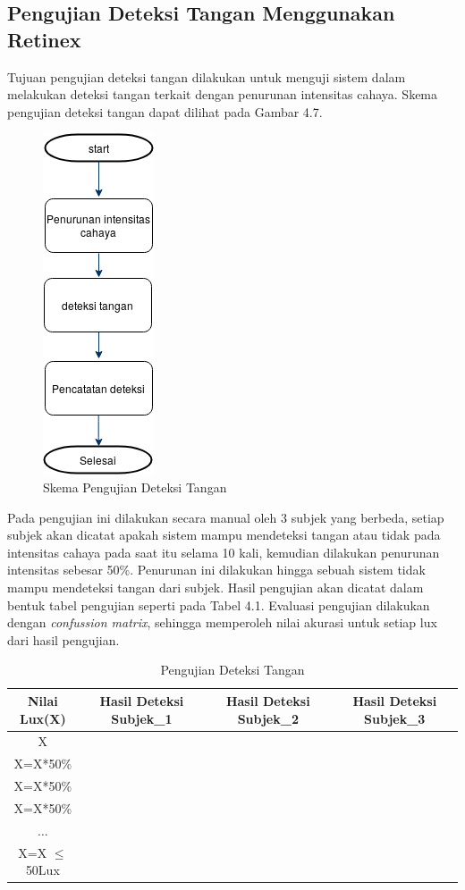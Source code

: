 \subsection{Pengujian Deteksi Tangan Menggunakan Retinex}
Tujuan pengujian deteksi tangan dilakukan untuk menguji sistem dalam melakukan deteksi tangan terkait dengan penurunan intensitas cahaya. Skema pengujian deteksi tangan dapat dilihat pada Gambar 4.7.
\begin{figure}[H]
	\centering
	\includegraphics[width=0.19\linewidth]{"skema objek deteksi"}
	\caption{Skema Pengujian Deteksi Tangan}
	\label{fig:skema-objek-deteksi}
\end{figure}
Pada pengujian ini dilakukan secara manual oleh 3 subjek yang berbeda, setiap subjek akan dicatat apakah sistem mampu mendeteksi tangan atau tidak pada intensitas cahaya pada saat itu selama 10 kali, kemudian dilakukan penurunan intensitas sebesar 50\%. Penurunan ini dilakukan hingga sebuah sistem tidak mampu mendeteksi tangan dari subjek. Hasil pengujian akan dicatat dalam bentuk tabel pengujian seperti pada Tabel 4.1. Evaluasi pengujian dilakukan dengan \emph{confussion matrix}, sehingga memperoleh nilai akurasi untuk setiap lux dari hasil pengujian.
\begin{table}[H]
	\caption{Pengujian Deteksi Tangan}
	\vspace{0.2cm}
	\centering
	\begin{tabular}{|c|c|c|c|c|c|c|c|c|c|c|c|c|c|c|c|c|c|c|c|c|c|c|c|c|c|c|c|c|c|c|}
		\hline
		Nilai Lux(X) & \multicolumn{10}{|c|}{Hasil Deteksi Subjek\_1} & \multicolumn{10}{|c|}{Hasil Deteksi Subjek\_2}& \multicolumn{10}{|c|}{Hasil Deteksi Subjek\_3}\\
		\hline X & & & &&&&&&&&&&&&&&&&&&&&&&&&&&&\\
		\hline X=X*50\% & & & &&&&&&&&&&&&&&&&&&&&&&&&&&&\\
		\hline X=X*50\% & & & & && &&&&&&&&&&&&&&&&&&&&&&&&\\
		\hline X=X*50\% & & & &&&&&&& &&&&&&&&&&&&&&&&&&&&\\
		\hline $\dots$ & & & & & &&&&&&&&&&&&&&&&&&&&&&&&&\\
		\hline X=X $\le$ 50Lux & & & &&&&&&& &&&&&&&&&&&&&&&&&&&&\\
		\hline
	\end{tabular}
\end{table}
